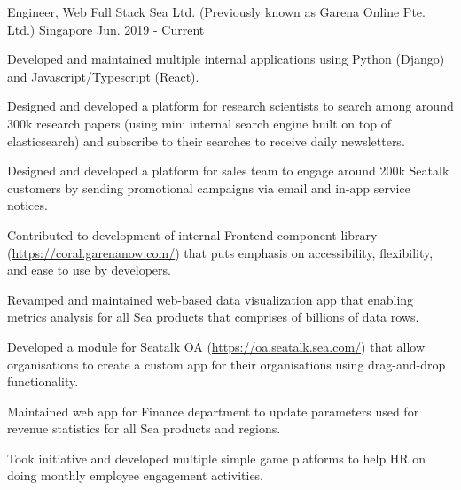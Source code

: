 

\begin{cventries}

  \cventry
    {Engineer, Web Full Stack} %
    {Sea Ltd. (Previously known as Garena Online Pte. Ltd.)} %
    {Singapore} %
    {Jun. 2019 - Current} %
    {
      \begin{cvitems} %
        \item {Developed and maintained multiple internal applications using Python (Django) and Javascript/Typescript (React).}
        \item {Designed and developed a platform for research scientists to search among around 300k research papers (using mini internal search engine built on top of elasticsearch) and subscribe to their searches to receive daily newsletters.}
        \item {Designed and developed a platform for sales team to engage around 200k Seatalk customers by sending promotional campaigns via email and in-app service notices.}
        \item {Contributed to development of internal Frontend component library (\url{https://coral.garenanow.com/}) that puts emphasis on accessibility, flexibility, and ease to use by developers.}
        \item {Revamped and maintained web-based data visualization app that enabling metrics analysis for all Sea products that comprises of billions of data rows.}
        \item {Developed a module for Seatalk OA (\url{https://oa.seatalk.sea.com/}) that allow organisations to create a custom app for their organisations using drag-and-drop functionality.}
        \item {Maintained web app for Finance department to update parameters used for revenue statistics for all Sea products and regions.}
        \item {Took initiative and developed multiple simple game platforms to help HR on doing monthly employee engagement activities.}
      \end{cvitems}
    }


\end{cventries}
